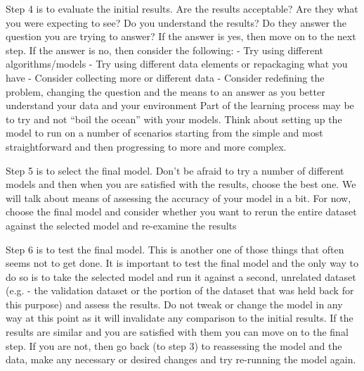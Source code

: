 \begin{frame}
Step 4 is to evaluate the initial results. Are the results acceptable? Are they what you were expecting
to see? Do you understand the results? Do they answer the question you are trying to answer? If the
answer is yes, then move on to the next step. If the answer is no, then consider the following:
- Try using different algorithms/models
- Try using different data elements or repackaging what you have
- Consider collecting more or different data
- Consider redefining the problem, changing the question and the means to an answer as you
better understand your data and your environment
Part of the learning process may be to try and not “boil the ocean” with your models. Think about
setting up the model to run on a number of scenarios starting from the simple and most straightforward
and then progressing to more and more complex.
\end{frame}
\begin{frame}Step 5 is to select the final model. Don’t be afraid to try a number of different models and then when
you are satisfied with the results, choose the best one. We will talk about means of assessing the
accuracy of your model in a bit. For now, choose the final model and consider whether you want to rerun
the entire dataset against the selected model and re-examine the results
\end{frame}
\begin{frame}
Step 6 is to test the final model. This is another one of those things that often seems not to get done.
It is important to test the final model and the only way to do so is to take the selected model and run it
against a second, unrelated dataset (e.g. - the validation dataset or the portion of the dataset that was
held back for this purpose) and assess the results. Do not tweak or change the model in any way at this
point as it will invalidate any comparison to the initial results. If the results are similar and you are
satisfied with them you can move on to the final step. If you are not, then go back (to step 3) to
reassessing the model and the data, make any necessary or desired changes and try re-running the
model again.
\end{frame}

